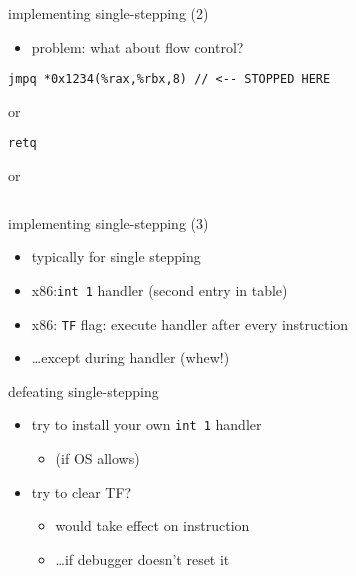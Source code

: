 \begin{frame}[fragile,label=implSingleStep2]{implementing single-stepping (2)}
\lstset{language=myasm,style=small}
\begin{itemize}
    \item problem: what about flow control?
\end{itemize}
\begin{lstlisting}
jmpq *0x1234(%rax,%rbx,8) // <-- STOPPED HERE
\end{lstlisting}
or
\begin{lstlisting}
retq
\end{lstlisting}
or
\begin{lstlisting}

\end{lstlisting}
\end{frame}

\begin{frame}[fragile,label=implSingleStepB]{implementing single-stepping (3)}
\lstset{language=myasm,style=small}
    \begin{itemize}
    \item typically  for single stepping
    \item x86:{\tt int 1} handler (second entry in table)
    \item x86: {\tt TF} flag: execute handler after every instruction
    \item \ldots except during handler (whew!)
    \end{itemize}
\end{frame}

\begin{frame}[fragile,label=defeatSingleStep]{defeating single-stepping}
    \begin{itemize}
    \item try to install your own {\tt int 1} handler
        \begin{itemize}
        \item (if OS allows)
        \end{itemize}
    \item try to clear TF?
        \begin{itemize}
        \item would take effect on  instruction
        \item \ldots if debugger doesn't reset it
        \end{itemize}
    \end{itemize}
\end{frame}

